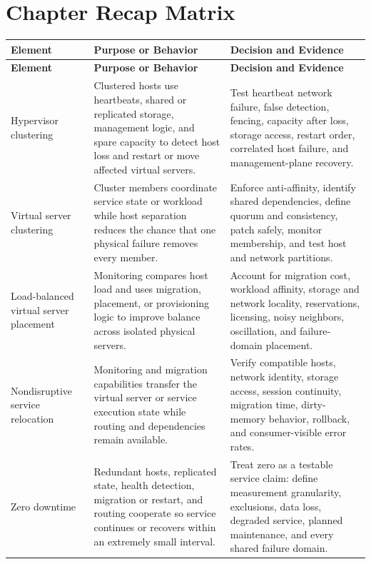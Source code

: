 \documentclass[11pt]{article}
\begin{document}
\section{Chapter Recap Matrix}
\begingroup\small\setlength{\tabcolsep}{4pt}
\begin{longtable}{@{}>{\RaggedRight\arraybackslash}p{}>{\RaggedRight\arraybackslash}p{}>{\RaggedRight\arraybackslash}p{}@{}}
\toprule\rowcolor{Navy}\color{white}\textbf{Element} & \color{white}\textbf{Purpose or Behavior} & \color{white}\textbf{Decision and Evidence}\\\midrule\endfirsthead
\toprule\rowcolor{Navy}\color{white}\textbf{Element} & \color{white}\textbf{Purpose or Behavior} & \color{white}\textbf{Decision and Evidence}\\\midrule\endhead
Hypervisor clustering & Clustered hosts use heartbeats, shared or replicated storage, management logic, and spare capacity to detect host loss and restart or move affected virtual servers. & Test heartbeat network failure, false detection, fencing, capacity after loss, storage access, restart order, correlated host failure, and management-plane recovery. \\\midrule
Virtual server clustering & Cluster members coordinate service state or workload while host separation reduces the chance that one physical failure removes every member. & Enforce anti-affinity, identify shared dependencies, define quorum and consistency, patch safely, monitor membership, and test host and network partitions. \\\midrule
Load-balanced virtual server placement & Monitoring compares host load and uses migration, placement, or provisioning logic to improve balance across isolated physical servers. & Account for migration cost, workload affinity, storage and network locality, reservations, licensing, noisy neighbors, oscillation, and failure-domain placement. \\\midrule
Nondisruptive service relocation & Monitoring and migration capabilities transfer the virtual server or service execution state while routing and dependencies remain available. & Verify compatible hosts, network identity, storage access, session continuity, migration time, dirty-memory behavior, rollback, and consumer-visible error rates. \\\midrule
Zero downtime & Redundant hosts, replicated state, health detection, migration or restart, and routing cooperate so service continues or recovers within an extremely small interval. & Treat zero as a testable service claim: define measurement granularity, exclusions, data loss, degraded service, planned maintenance, and every shared failure domain. \\\midrule

\end{longtable}
\end{document}
